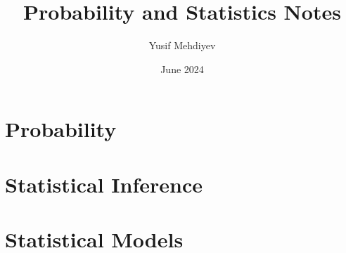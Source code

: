 \documentclass[11pt]{scrreprt}
\begin{document}
\renewcommand{\figurename}{Image}

\title{Probability and Statistics Notes}
\author{Yusif Mehdiyev}
\date{June 2024}
\maketitle


\tableofcontents

\part{Probability}





\part{Statistical Inference}





\part{Statistical Models}





\end{document}
